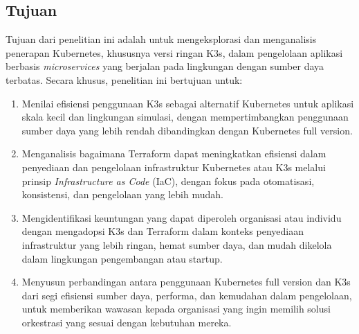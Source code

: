 \subsection{Tujuan}

Tujuan dari penelitian ini adalah untuk mengeksplorasi dan menganalisis penerapan Kubernetes, khususnya versi ringan K3s, dalam pengelolaan aplikasi berbasis \textit{microservices} yang berjalan pada lingkungan dengan sumber daya terbatas. Secara khusus, penelitian ini bertujuan untuk:

\begin{enumerate}
    \item Menilai efisiensi penggunaan K3s sebagai alternatif Kubernetes untuk aplikasi skala kecil dan lingkungan simulasi, dengan mempertimbangkan penggunaan sumber daya yang lebih rendah dibandingkan dengan Kubernetes full version.
    
    \item Menganalisis bagaimana Terraform dapat meningkatkan efisiensi dalam penyediaan dan pengelolaan infrastruktur Kubernetes atau K3s melalui prinsip \textit{Infrastructure as Code} (IaC), dengan fokus pada otomatisasi, konsistensi, dan pengelolaan yang lebih mudah.
    
    \item Mengidentifikasi keuntungan yang dapat diperoleh organisasi atau individu dengan mengadopsi K3s dan Terraform dalam konteks penyediaan infrastruktur yang lebih ringan, hemat sumber daya, dan mudah dikelola dalam lingkungan pengembangan atau startup.
    
    \item Menyusun perbandingan antara penggunaan Kubernetes full version dan K3s dari segi efisiensi sumber daya, performa, dan kemudahan dalam pengelolaan, untuk memberikan wawasan kepada organisasi yang ingin memilih solusi orkestrasi yang sesuai dengan kebutuhan mereka.
\end{enumerate}